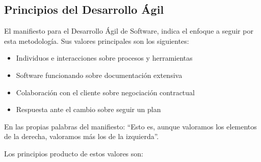 \subsection{Principios del Desarrollo Ágil}

El manifiesto para el Desarrollo Ágil de Software, indica el enfoque a seguir por esta metodología. Sus valores principales son los siguientes:

\begin{itemize}
	\itemsep1pt \parskip1pt 
	\item Individuos e interacciones sobre procesos y herramientas
	\item Software funcionando sobre documentación extensiva
	\item Colaboración con el cliente sobre negociación contractual
	\item Respuesta ante el cambio sobre seguir un plan
\end{itemize}

En las propias palabras del manifiesto: ``Esto es, aunque valoramos los elementos de la derecha, valoramos más los de la izquierda''.\cite{beck2001manifiesto}

Los principios producto de estos valores son:\cite{beck2001principios}

